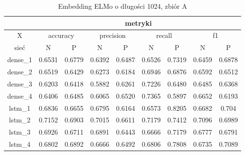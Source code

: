 \begin{table}[p] \label{tab:wyniki_elmo_A} \centering
    \caption{Embedding ELMo o długości 1024, zbiór A}
    \begin{tabular}{|c|c|c|c|c|c|c|c|c|}    \hline
                 & \multicolumn{8}{c|}{metryki}                                                                                                                               \\ \hline
        X        & \multicolumn{2}{c|}{accuracy} & \multicolumn{2}{c|}{precision} & \multicolumn{2}{c|}{recall} & \multicolumn{2}{c|}{f1}                                     \\ \hline
        sieć     & N                             & P                              & N                           & P                       & N      & P      & N      & P      \\ \hline
        dense\_1 & 0.6531                        & 0.6779                         & 0.6392                      & 0.6487                  & 0.6526 & 0.7319 & 0.6459 & 0.6878 \\ \hline
        dense\_2 & 0.6519                        & 0.6429                         & 0.6273                      & 0.6184                  & 0.6946 & 0.6876 & 0.6592 & 0.6512 \\ \hline
        dense\_3 & 0.6203                        & 0.6418                         & 0.5882                      & 0.6261                  & 0.7226 & 0.6480 & 0.6485 & 0.6368 \\ \hline
        dense\_4 & 0.6406                        & 0.6485                         & 0.6065                      & 0.6520                  & 0.7365 & 0.5897 & 0.6652 & 0.6193 \\ \hline
        lstm\_1  & 0.6836                        & 0.6655                         & 0.6795                      & 0.6164                  & 0.6573 & 0.8205 & 0.6682 & 0.704  \\ \hline
        lstm\_2  & 0.7152                        & 0.6903                         & 0.7015                      & 0.6611                  & 0.7179 & 0.7412 & 0.7096 & 0.6989 \\ \hline
        lstm\_3  & 0.6926                        & 0.6711                         & 0.6891                      & 0.6443                  & 0.6666 & 0.7179 & 0.6777 & 0.6791 \\ \hline
        lstm\_4  & 0.6802                        & 0.6892                         & 0.6666                      & 0.6492                  & 0.6806 & 0.7808 & 0.6735 & 0.7089 \\ \hline

\end{tabular}
\end{table}
